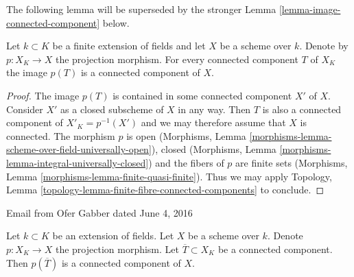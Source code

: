 \noindent
The following lemma will be superseded by the stronger
Lemma \ref{lemma-image-connected-component} below.

\begin{lemma}
\label{lemma-image-connected-component-finite-extension}
Let $k \subset K$ be a finite extension of fields and let $X$ be a scheme over 
$k$. Denote by $p : X_K \to X$ the projection morphism. For every connected 
component $T$ of $X_K$ the image $p(T)$ is a connected component of 
$X$.
\end{lemma}

\begin{proof}
The image $p(T)$ is contained in some connected component $X'$ of $X$. Consider
$X'$ as a closed subscheme of $X$ in any way. Then $T$ is also a connected
component of $X'_K = p^{-1}(X')$ and we may therefore assume that $X$ is
connected. The morphism $p$ is open
(Morphisms, Lemma \ref{morphisms-lemma-scheme-over-field-universally-open}), 
closed
(Morphisms, Lemma \ref{morphisms-lemma-integral-universally-closed})
and the fibers of $p$ are finite sets
(Morphisms, Lemma \ref{morphisms-lemma-finite-quasi-finite}).
Thus we may apply
Topology, Lemma \ref{topology-lemma-finite-fibre-connected-components}
to conclude.
\end{proof}

\begin{lemma}[Gabber]
\label{lemma-image-connected-component}
\begin{reference}
Email from Ofer Gabber dated June 4, 2016
\end{reference}
Let $k \subset K$ be an extension of fields. Let $X$ be a scheme over $k$.
Denote $p : X_K \to X$ the projection morphism.
Let $\overline{T} \subset X_K$ be a connected component.
Then $p(\overline{T})$ is a connected component of $X$.
\end{lemma}

